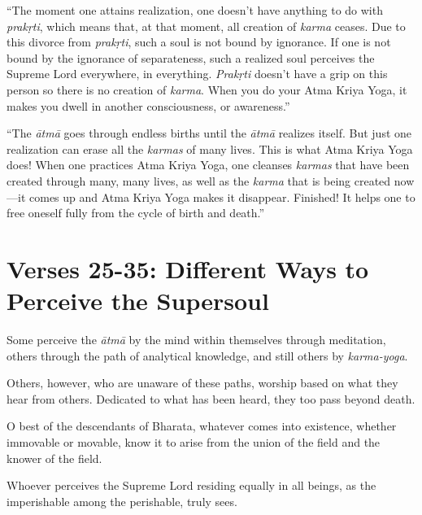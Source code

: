 \enquote{The moment one attains realization, one doesn’t have anything to do with \textit{prakṛti}, which means that, at that moment, all creation of \textit{karma} ceases. Due to this divorce from \textit{prakṛti}, such a soul is not bound by ignorance. If one is not bound by the ignorance of separateness, such a realized soul perceives the Supreme Lord everywhere, in everything. \textit{Prakṛti} doesn’t have a grip on this person so there is no creation of \textit{karma}. When you do your Atma Kriya Yoga, it makes you dwell in another consciousness, or awareness.}

\enquote{The \textit{ātmā} goes through endless births until the \textit{ātmā} realizes itself. But just one realization can erase all the \textit{karmas} of many lives. This is what Atma Kriya Yoga does! When one practices Atma Kriya Yoga, one cleanses \textit{karmas} that have been created through many, many lives, as well as the \textit{karma} that is being created now---it comes up and Atma Kriya Yoga makes it disappear. Finished! It helps one to free oneself fully from the cycle of birth and death.}

\section{Verses 25-35: Different Ways to Perceive the Supersoul}\label{sec-verses-25-35-different-ways-to-perceive-the-supersoul}

{Some perceive the \textit{ātmā} by the mind within themselves through meditation, others through the path of analytical knowledge, and still others by \textit{karma-yoga}.}

{Others, however, who are unaware of these paths, worship based on what they hear from others. Dedicated to what has been heard, they too pass beyond death.}

{O best of the descendants of Bharata, whatever comes into existence, whether immovable or movable, know it to arise from the union of the field and the knower of the field.}

{Whoever perceives the Supreme Lord residing equally in all beings, as the imperishable among the perishable, truly sees.}

